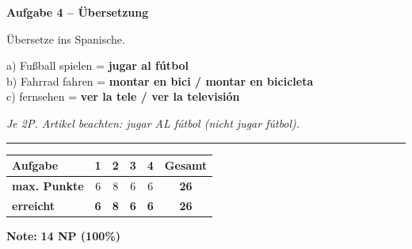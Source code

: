 \documentclass[11pt, a4paper]{article}
\newcommand{\fachfarbe}{spanisch}
\newcommand{\punktebox}[1]{\hfill\fbox{\small \_/#1}}
\newcommand{\lsg}[1]{\textcolor{loesung}{\textbf{#1}}}
\newenvironment{aufgabe}[1]{%
    \needspace{5\baselineskip}%
    \nopagebreak[4]%
    \vspace{10pt}
    \noindent\textbf{\textcolor{\fachfarbe}{Aufgabe #1}}
    \nopagebreak[4]%
    \vspace{5pt}
    \nopagebreak[4]%
    \begin{list}{}{\leftmargin=0pt}
    \item[]
}{%
    \end{list}
}
\begin{document}
\vspace{15pt}


\begin{aufgabe}{4 -- Übersetzung}
Übersetze ins Spanische. \punktebox{6}
\end{aufgabe}

\noindent
a) Fußball spielen = \lsg{jugar al fútbol}\\[1em]
b) Fahrrad fahren = \lsg{montar en bici / montar en bicicleta}\\[1em]
c) fernsehen = \lsg{ver la tele / ver la televisión}

\textit{\textcolor{grau}{Je 2P. Artikel beachten: jugar AL fútbol (nicht jugar fútbol).}}


\vspace{25pt}
\hrule
\vspace{10pt}

\noindent
\begin{tabularx}{\textwidth}{|X|c|c|c|c||c|}
\hline
\textbf{Aufgabe} & 1 & 2 & 3 & 4 & \textbf{Gesamt} \\
\hline
\textbf{max. Punkte} & 6 & 8 & 6 & 6 & \textbf{26} \\
\hline
\textbf{erreicht} & \lsg{6} & \lsg{8} & \lsg{6} & \lsg{6} & \lsg{26} \\[0.8em]
\hline
\end{tabularx}

\vspace{10pt}

\begin{flushright}
\textbf{Note:} \lsg{14 NP (100\%)}
\end{flushright}
\end{document}
